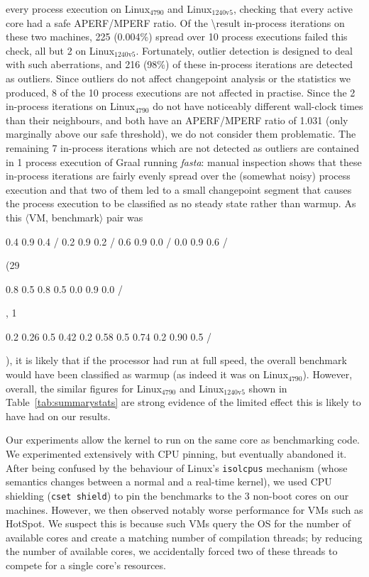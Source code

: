 \documentclass[acmsmall]{acmart}\settopmatter{printfolios=true}
\newcommand{\fasta}{\emph{fasta}\xspace}
\newcommand{\bencherfive}{Linux$_\mathrm{4790}$\xspace}
\newcommand{\bencherseven}{Linux$_\mathrm{1240v5}$\xspace}
\newcommand{\vmbpair}{$\langle$VM, benchmark$\rangle$\xspace}
\DeclareRobustCommand{\nosteadystate}{%
\setlength{\sparklinethickness}{0.4pt}%
\begin{sparkline}{1.5}
\spark 0.1 0.2
       0.26 0.5
       0.42 0.2
       0.58 0.5
       0.74 0.2
       0.90 0.5
       /%
\end{sparkline}\xspace%
}
\DeclareRobustCommand{\warmup}{%
\setlength{\sparklinethickness}{0.4pt}%
\begin{sparkline}{1.5}
\spark 0.1 0.8
       0.5 0.8
       0.5 0.0
       0.9 0.0
       /%
\end{sparkline}\xspace%
}
\DeclareRobustCommand{\badinconsistent}{%
\setlength{\sparklinethickness}{0.4pt}%
\begin{sparkline}{1.5}
\spark 0.1 0.4
       0.9 0.4
       /%
\spark 0.1 0.2
       0.9 0.2
       /%
\spark 0.1 0.6
       0.9 0.0
       /%
\spark 0.1 0.0
       0.9 0.6
       /%
\end{sparkline}\xspace%
}
\begin{document}
every process execution on \bencherfive and \bencherseven, checking that every
%
active core had a safe APERF/MPERF ratio. Of the \num{\result}\xspace in-process iterations
on these two machines, 225 (0.004\%) spread over 10 process executions failed
this check, all but 2 on \bencherseven. Fortunately, outlier detection is designed
to deal with such aberrations, and 216 (98\%) of these in-process iterations are
detected as outliers. Since outliers do not affect changepoint analysis or
the statistics we produced, 8 of the 10 process executions are not affected in practise.
Since the 2 in-process iterations on \bencherfive do not have noticeably different wall-clock
times than their neighbours, and both have an APERF/MPERF ratio of 1.031
(only marginally above our safe threshold), we do not consider them problematic.
The remaining 7 in-process iterations which are not
detected as outliers are contained in 1 process execution of Graal running
\fasta: manual inspection shows that these in-process iterations are fairly
evenly spread over the (somewhat noisy) process execution and that two of them led
to a small changepoint segment that causes the process execution to be
classified as no steady state rather than warmup. As this \vmbpair pair was
\badinconsistent(29\warmup, 1\nosteadystate), it is likely that if
the processor had run at full speed, the overall benchmark
would have been classified as warmup (as indeed it was
on \bencherfive). However, overall, the similar figures
for \bencherfive and \bencherseven shown in Table~\ref{tab:summarystats} are
strong evidence of the limited effect this is likely to have had on our results.

Our experiments allow the kernel to run on the same core as benchmarking code.
We experimented extensively with CPU pinning, but eventually abandoned it. After
being confused by the behaviour of Linux's \texttt{isolcpus} mechanism (whose
semantics changes between a normal and a real-time kernel), we used CPU shielding
(\texttt{cset shield}) to pin the benchmarks to the 3 non-boot cores on our
machines. However, we then observed notably worse performance for VMs such as
HotSpot. We suspect this is because such VMs query the OS for the number of
available cores and create a matching number of compilation threads; by reducing
the number of available cores, we accidentally forced two of these threads to
compete for a single core's resources.
\end{document}
